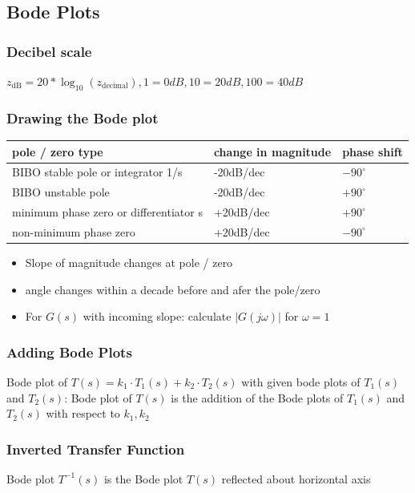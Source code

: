\subsection{Bode Plots}
    \subsubsection{Decibel scale}
        $z_{\text{dB}} = 20 * \log_{10}(z_{\text{decimal}}), 1 = 0dB, 10 = 20 dB, 100 = 40 dB$
    
    \subsubsection{Drawing the Bode plot}
        \begin{tabu}{| X | X | X |}
            \hline
            pole / zero type & change in magnitude & phase shift\\
            \hline \hline
            BIBO stable pole or integrator 1/s & -20dB/dec & $-90^{\circ}$\\
            \hline
            BIBO unstable pole & -20dB/dec & $+90^{\circ}$\\
            \hline
            minimum phase zero or differentiator s & +20dB/dec & $+90^{\circ}$\\
            \hline
            non-minimum phase zero & +20dB/dec & $-90^{\circ}$\\
            \hline
        \end{tabu}
        \begin{itemize}
            \item Slope of magnitude changes at pole / zero
            \item angle changes within a decade before and afer the pole/zero
            \item For $G(s)$ with incoming slope: calculate $|G(j \omega)|$ for $\omega = 1$
        \end{itemize}

    \subsubsection{Adding Bode Plots}
        Bode plot of $T(s) = k_1 \cdot T_1(s) + k_2 \cdot T_2(s)$ with given bode plots of $T_1(s)$ and $T_2(s)$:
        Bode plot of $T(s)$ is the addition of the Bode plots of $T_1(s)$ and $T_2(s)$ with respect to $k_1, k_2$

    \subsubsection{Inverted Transfer Function}
        Bode plot $T^{-1}(s)$ is the Bode plot $T(s)$ reflected about horizontal axis

